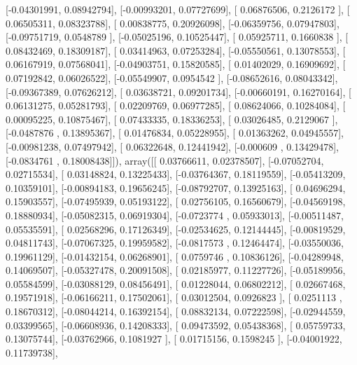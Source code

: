 \documentclass{article}
\begin{document}
       [-0.04301991,  0.08942794],
       [-0.00993201,  0.07727699],
       [ 0.06876506,  0.2126172 ],
       [ 0.06505311,  0.08323788],
       [ 0.00838775,  0.20926098],
       [-0.06359756,  0.07947803],
       [-0.09751719,  0.0548789 ],
       [-0.05025196,  0.10525447],
       [ 0.05925711,  0.1660838 ],
       [ 0.08432469,  0.18309187],
       [ 0.03414963,  0.07253284],
       [-0.05550561,  0.13078553],
       [ 0.06167919,  0.07568041],
       [-0.04903751,  0.15820585],
       [ 0.01402029,  0.16909692],
       [ 0.07192842,  0.06026522],
       [-0.05549907,  0.0954542 ],
       [-0.08652616,  0.08043342],
       [-0.09367389,  0.07626212],
       [ 0.03638721,  0.09201734],
       [-0.00660191,  0.16270164],
       [ 0.06131275,  0.05281793],
       [ 0.02209769,  0.06977285],
       [ 0.08624066,  0.10284084],
       [ 0.00095225,  0.10875467],
       [ 0.07433335,  0.18336253],
       [ 0.03026485,  0.2129067 ],
       [-0.0487876 ,  0.13895367],
       [ 0.01476834,  0.05228955],
       [ 0.01363262,  0.04945557],
       [-0.00981238,  0.07497942],
       [ 0.06322648,  0.12441942],
       [-0.000609  ,  0.13429478],
       [-0.0834761 ,  0.18008438]]), array([[ 0.03766611,  0.02378507],
       [-0.07052704,  0.02715534],
       [ 0.03148824,  0.13225433],
       [-0.03764367,  0.18119559],
       [-0.05413209,  0.10359101],
       [-0.00894183,  0.19656245],
       [-0.08792707,  0.13925163],
       [ 0.04696294,  0.15903557],
       [-0.07495939,  0.05193122],
       [ 0.02756105,  0.16560679],
       [-0.04569198,  0.18880934],
       [-0.05082315,  0.06919304],
       [-0.0723774 ,  0.05933013],
       [-0.00511487,  0.05535591],
       [ 0.02568296,  0.17126349],
       [-0.02534625,  0.12144445],
       [-0.00819529,  0.04811743],
       [-0.07067325,  0.19959582],
       [-0.0817573 ,  0.12464474],
       [-0.03550036,  0.19961129],
       [-0.01432154,  0.06268901],
       [ 0.0759746 ,  0.10836126],
       [-0.04289948,  0.14069507],
       [-0.05327478,  0.20091508],
       [ 0.02185977,  0.11227726],
       [-0.05189956,  0.05584599],
       [-0.03088129,  0.08456491],
       [ 0.01228044,  0.06802212],
       [ 0.02667468,  0.19571918],
       [-0.06166211,  0.17502061],
       [ 0.03012504,  0.0926823 ],
       [ 0.0251113 ,  0.18670312],
       [-0.08044214,  0.16392154],
       [ 0.08832134,  0.07222598],
       [-0.02944559,  0.03399565],
       [-0.06608936,  0.14208333],
       [ 0.09473592,  0.05438368],
       [ 0.05759733,  0.13075744],
       [-0.03762966,  0.1081927 ],
       [ 0.01715156,  0.1598245 ],
       [-0.04001922,  0.11739738],
\end{document}
